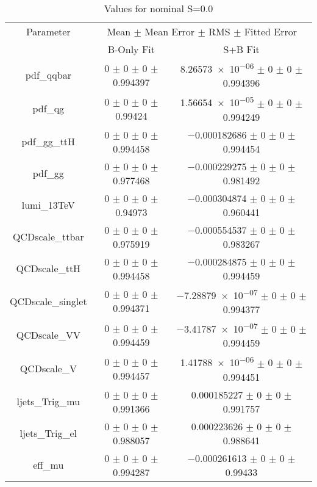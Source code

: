 \begin{table}
\centering
\caption{Values for nominal S=0.0}
\begin{tabular}{ccc}
\toprule
Parameter & \multicolumn{2}{c}{Mean $\pm$ Mean Error $\pm$ RMS $\pm$ Fitted Error}\\
 & B-Only Fit & S+B Fit\\
\midrule
pdf\_qqbar & \num{0} $\pm$ \num{0} $\pm$ \num{0} $\pm$ \num{0.994397} & \num{8.26573e-06} $\pm$ \num{0} $\pm$ \num{0} $\pm$ \num{0.994396}\\
pdf\_qg & \num{0} $\pm$ \num{0} $\pm$ \num{0} $\pm$ \num{0.99424} & \num{1.56654e-05} $\pm$ \num{0} $\pm$ \num{0} $\pm$ \num{0.994249}\\
pdf\_gg\_ttH & \num{0} $\pm$ \num{0} $\pm$ \num{0} $\pm$ \num{0.994458} & \num{-0.000182686} $\pm$ \num{0} $\pm$ \num{0} $\pm$ \num{0.994454}\\
pdf\_gg & \num{0} $\pm$ \num{0} $\pm$ \num{0} $\pm$ \num{0.977468} & \num{-0.000229275} $\pm$ \num{0} $\pm$ \num{0} $\pm$ \num{0.981492}\\
lumi\_13TeV & \num{0} $\pm$ \num{0} $\pm$ \num{0} $\pm$ \num{0.94973} & \num{-0.000304874} $\pm$ \num{0} $\pm$ \num{0} $\pm$ \num{0.960441}\\
QCDscale\_ttbar & \num{0} $\pm$ \num{0} $\pm$ \num{0} $\pm$ \num{0.975919} & \num{-0.000554537} $\pm$ \num{0} $\pm$ \num{0} $\pm$ \num{0.983267}\\
QCDscale\_ttH & \num{0} $\pm$ \num{0} $\pm$ \num{0} $\pm$ \num{0.994458} & \num{-0.000284875} $\pm$ \num{0} $\pm$ \num{0} $\pm$ \num{0.994459}\\
QCDscale\_singlet & \num{0} $\pm$ \num{0} $\pm$ \num{0} $\pm$ \num{0.994371} & \num{-7.28879e-07} $\pm$ \num{0} $\pm$ \num{0} $\pm$ \num{0.994377}\\
QCDscale\_VV & \num{0} $\pm$ \num{0} $\pm$ \num{0} $\pm$ \num{0.994459} & \num{-3.41787e-07} $\pm$ \num{0} $\pm$ \num{0} $\pm$ \num{0.994459}\\
QCDscale\_V & \num{0} $\pm$ \num{0} $\pm$ \num{0} $\pm$ \num{0.994457} & \num{1.41788e-06} $\pm$ \num{0} $\pm$ \num{0} $\pm$ \num{0.994451}\\
ljets\_Trig\_mu & \num{0} $\pm$ \num{0} $\pm$ \num{0} $\pm$ \num{0.991366} & \num{0.000185227} $\pm$ \num{0} $\pm$ \num{0} $\pm$ \num{0.991757}\\
ljets\_Trig\_el & \num{0} $\pm$ \num{0} $\pm$ \num{0} $\pm$ \num{0.988057} & \num{0.000223626} $\pm$ \num{0} $\pm$ \num{0} $\pm$ \num{0.988641}\\
eff\_mu & \num{0} $\pm$ \num{0} $\pm$ \num{0} $\pm$ \num{0.994287} & \num{-0.000261613} $\pm$ \num{0} $\pm$ \num{0} $\pm$ \num{0.99433}\\

\end{tabular}
\end{table}
